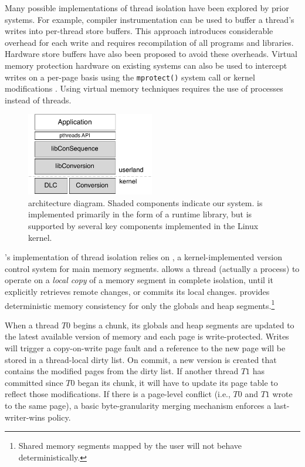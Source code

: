 Many possible implementations of thread isolation have been explored by prior systems. For example, compiler instrumentation \cite{bergan_coredet:_2010, kai_lu_efficient_2014} can be used to buffer a thread's writes into per-thread store buffers. This approach introduces considerable overhead for each write and requires recompilation of all programs and libraries. Hardware store buffers \cite{devietti_rcdc:_2011,derek_r._hower_calvin:_2011,jooybar_gpudet:_2013} have also been proposed to avoid these overheads. Virtual memory protection hardware on existing systems can also be used to intercept writes on a per-page basis using the {\tt mprotect()} system call \cite{liu_dthreads:_2011} or kernel modifications \cite{merrifield_conversion:_2013}. Using virtual memory techniques requires the use of processes instead of threads.

\begin{figure}
\begin{center}
\includegraphics[width=2.2in]{figures/arch}
\caption{\lib{} architecture diagram. Shaded components indicate our system. \lib{} is implemented primarily in the form of a runtime library, but is supported by several key components implemented in the Linux kernel.}
\label{f:arch}
\end{center}
\end{figure}


\lib{}'s implementation of thread isolation relies on \conversion{} \cite{merrifield_conversion:_2013}, a kernel-implemented version control system for main memory segments.
\conversion{} allows a \lib{} thread (actually a process) to operate on a {\it local copy} of a memory segment in complete isolation, until it explicitly retrieves remote changes, or commits its local changes. \lib{} provides deterministic memory consistency for only the globals and heap segments.\footnote{Shared memory segments mapped by the user will not behave deterministically.}

When a thread $T0$ begins a chunk, its globals and heap segments are updated to the latest available version of memory and each page is write-protected.  Writes will trigger a copy-on-write page fault and a reference to the new page will be stored in a thread-local dirty list. On commit, a new version is created that contains the modified pages from the dirty list. If another thread $T1$ has committed since $T0$ began its chunk, it will have to update its page table to reflect those modifications. If there is a page-level conflict (i.e., $T0$ and $T1$ wrote to the same page), a basic byte-granularity merging mechanism enforces a last-writer-wins policy. 

